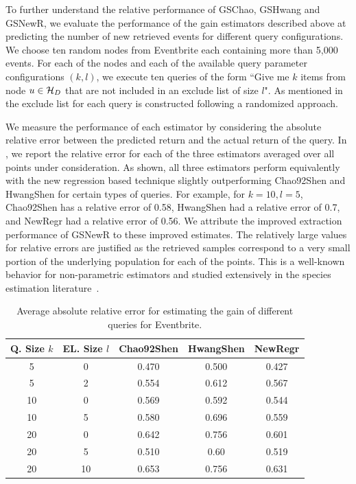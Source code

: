 To further understand the relative performance of GSChao, GSHwang and GSNewR, we evaluate the performance of the gain estimators described above at predicting the number of new retrieved events for different query configurations. We choose ten random nodes from Eventbrite each containing more than 5,000 events. For each of the nodes and each of the available query parameter configurations $(k,l)$, we execute ten queries of the form ``Give me $k$ items from node $u \in \mathcal{H}_D$ that are not included in an exclude list of size $l$". As mentioned in  the exclude list for each query is constructed following a randomized approach. 

We measure the performance of each estimator by considering the absolute relative error between the predicted return and the actual return of the query. In , we report the relative error for each of the three estimators averaged over all points under consideration. As shown, all three estimators perform equivalently with the new regression based technique slightly outperforming Chao92Shen and HwangShen for certain types of queries. For example, for $k = 10, l = 5$, Chao92Shen has a relative error of 0.58, HwangShen had a relative error of 0.7, and NewRegr had a relative error of 0.56. We attribute the improved extraction performance of GSNewR to these improved estimates. The relatively large values for relative errors are justified as the retrieved samples correspond to a very small portion of the underlying population for each of the points. This is a well-known behavior for non-parametric estimators and studied extensively in the species estimation literature~\cite{hwang:2010}. 

\begin{table}
\scriptsize\center
\caption{Average absolute relative error for estimating the gain of different queries for Eventbrite.}
\label{tab:eventesterror}
\begin{tabular}{|c|c|c|c|c|}
\hline
\textbf{Q. Size $k$} & \textbf{EL. Size $l$} & \textbf{Chao92Shen} & \textbf{HwangShen} & \textbf{NewRegr} \\ \hline
5 & 0 & 0.470 & 0.500 & 0.427 \\
5 & 2 & 0.554 & 0.612 & 0.567\\
10 & 0 & 0.569 & 0.592 & 0.544\\
10 & 5 & 0.580 & 0.696 & 0.559\\
20 & 0 & 0.642 & 0.756 &0.601\\
20 & 5 & 0.510 & 0.60 & 0.519 \\
20 & 10 & 0.653 & 0.756 & 0.631\\
\hline
\end{tabular}
\vspace{-10pt}
\end{table}

